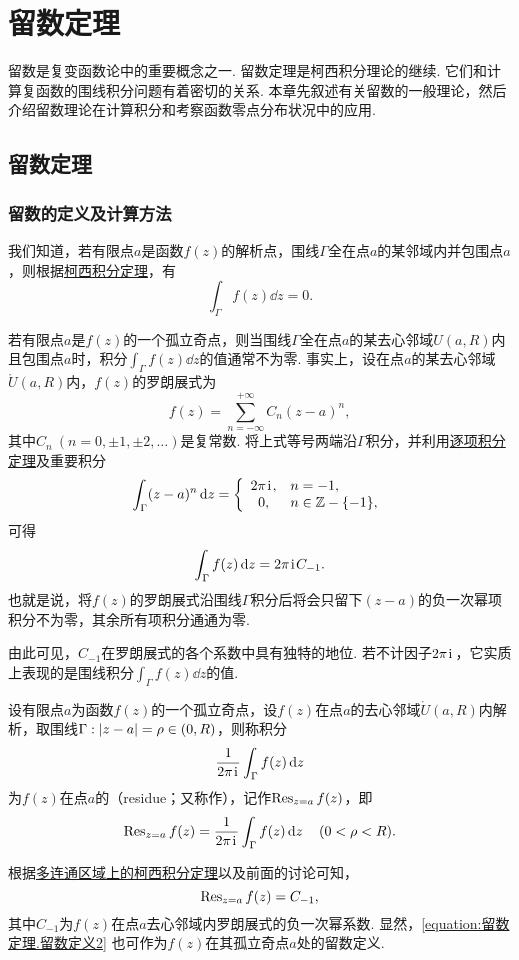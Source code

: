\chapter{留数定理}
留数是复变函数论中的重要概念之一.
留数定理是柯西积分理论的继续.
它们和计算复函数的围线积分问题有着密切的关系.
本章先叙述有关留数的一般理论，然后介绍留数理论在计算积分和考察函数零点分布状况中的应用.

\section{留数定理}
\subsection{留数的定义及计算方法}
我们知道，若有限点\(a\)是函数\(f(z)\)的解析点，围线\(\Gamma\)全在点\(a\)的某邻域内并包围点\(a\)，则根据\hyperref[theorem:解析函数的积分表示.柯西积分定理]{柯西积分定理}，有\[
\int_\Gamma f(z) \dd{z} = 0.
\]

若有限点\(a\)是\(f(z)\)的一个孤立奇点，则当围线\(\Gamma\)全在点\(a\)的某去心邻域\(U(a,R)\)内且包围点\(a\)时，积分\(\int_\Gamma f(z) \dd{z}\)的值通常不为零.
事实上，设在点\(a\)的某去心邻域\(\mathring{U}(a,R)\)内，\(f(z)\)的罗朗展式为\[
f(z) = \sum_{n=-\infty}^{+\infty} C_n (z-a)^n,
\]其中\(C_n\ (n=0,\pm1,\pm2,\dotsc)\)是复常数.
将上式等号两端沿\(\Gamma\)积分，并利用\hyperref[theorem:解析函数的级数表示.一致收敛级数的基本性质2]{逐项积分定理}及重要积分  \[
\int_\Gamma (z-a)^n \dd{z} = \left\{ \begin{array}{cl}
2\pi\kern1pt\mathrm{i}\kern1pt, & n=-1, \\
0,& n\in\mathbb{Z}-\{-1\},
\end{array} \right.
\]可得\[
\int_\Gamma f(z) \dd{z} = 2\pi\kern1pt\mathrm{i}\kern1pt C_{-1}.
\]也就是说，将\(f(z)\)的罗朗展式沿围线\(\Gamma\)积分后将会只留下\((z-a)\)的负一次幂项积分不为零，其余所有项积分通通为零.

由此可见，\(C_{-1}\)在罗朗展式的各个系数中具有独特的地位.
若不计因子\(2\pi\kern1pt\mathrm{i}\kern1pt\)，它实质上表现的是围线积分\(\int_\Gamma f(z) \dd{z}\)的值.

\begin{definition}
设有限点\(a\)为函数\(f(z)\)的一个孤立奇点，设\(f(z)\)在点\(a\)的去心邻域\(\mathring{U}(a,R)\)内解析，取围线\(\Gamma: \abs{z-a}=\rho\in(0,R)\)，则称积分\[
\frac{1}{2\pi\kern1pt\mathrm{i}\kern1pt} \int_\Gamma f(z) \dd{z}
\]为\(f(z)\)在点\(a\)的（residue；又称作），记作\(\operatorname{Res}_{z=a} f(z)\)，即\begin{equation}\label{equation:留数定理.留数定义1}
\operatorname{Res}_{z=a} f(z)
= \frac{1}{2\pi\kern1pt\mathrm{i}\kern1pt} \int_\Gamma f(z) \dd{z}
\quad(0<\rho<R).
\end{equation}
\end{definition}
根据\hyperref[theorem:解析函数的积分表示.多连通区域的柯西积分定理]{多连通区域上的柯西积分定理}以及前面的讨论可知，\begin{equation}\label{equation:留数定理.留数定义2}
\operatorname{Res}_{z=a} f(z) = C_{-1},
\end{equation}
其中\(C_{-1}\)为\(f(z)\)在点\(a\)去心邻域内罗朗展式的负一次幂系数.
显然，\cref{equation:留数定理.留数定义2} 也可作为\(f(z)\)在其孤立奇点\(a\)处的留数定义.

